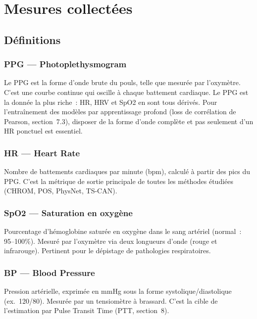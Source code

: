 \documentclass[11pt,a4paper]{article}
\begin{document}
\section{Mesures collect\'ees}

\subsection{D\'efinitions}

\subsubsection*{PPG --- Photoplethysmogram}

Le PPG est la forme d'onde brute du pouls, telle que mesur\'ee par
l'oxym\`etre. C'est une courbe continue qui oscille \`a chaque battement
cardiaque. Le PPG est la donn\'ee la plus riche~: HR, HRV et SpO2 en sont
tous d\'eriv\'es. Pour l'entra\^inement des mod\`eles par apprentissage
profond (loss de corr\'elation de Pearson, section~7.3), disposer de la
forme d'onde compl\`ete et pas seulement d'un HR ponctuel est
essentiel.

\subsubsection*{HR --- Heart Rate}

Nombre de battements cardiaques par minute (bpm), calcul\'e \`a partir des
pics du PPG. C'est la m\'etrique de sortie principale de toutes les
m\'ethodes \'etudi\'ees (CHROM, POS, PhysNet, TS-CAN).

\subsubsection*{SpO2 --- Saturation en oxyg\`ene}

Pourcentage d'h\'emoglobine satur\'ee en oxyg\`ene dans le sang art\'eriel
(normal~: 95--100\%). Mesur\'e par l'oxym\`etre via deux longueurs d'onde
(rouge et infrarouge). Pertinent pour le d\'epistage de pathologies
respiratoires.

\subsubsection*{BP --- Blood Pressure}

Pression art\'erielle, exprim\'ee en mmHg sous la forme
systolique/diastolique (ex.\ 120/80). Mesur\'ee par un tensiom\`etre \`a
brassard. C'est la cible de l'estimation par Pulse Transit Time (PTT,
section~8).
\end{document}
